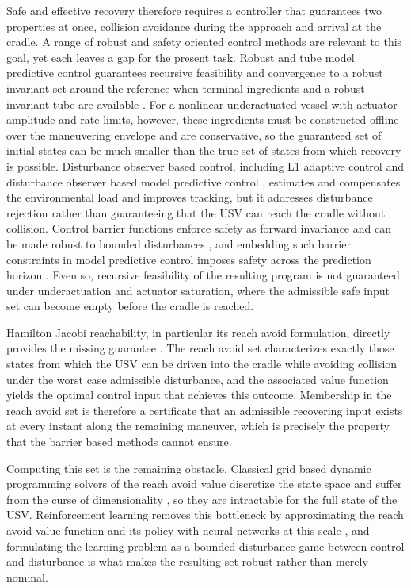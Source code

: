 \documentclass[5p,times,authoryear]{elsarticle}
\begin{document}
Safe and effective recovery therefore requires a controller that guarantees two properties at once, collision avoidance during the approach and arrival at the cradle. A range of robust and safety oriented control methods are relevant to this goal, yet each leaves a gap for the present task. Robust and tube model predictive control guarantees recursive feasibility and convergence to a robust invariant set around the reference when terminal ingredients and a robust invariant tube are available \citep{langson2004tube, mayne2005robust}. For a nonlinear underactuated vessel with actuator amplitude and rate limits, however, these ingredients must be constructed offline over the maneuvering envelope and are conservative, so the guaranteed set of initial states can be much smaller than the true set of states from which recovery is possible. Disturbance observer based control, including L1 adaptive control \citep{hovakimyan2010l1} and disturbance observer based model predictive control \citep{park2026recovery, tomera2021dob}, estimates and compensates the environmental load and improves tracking, but it addresses disturbance rejection rather than guaranteeing that the USV can reach the cradle without collision. Control barrier functions enforce safety as forward invariance and can be made robust to bounded disturbances \citep{xu2015robustness}, and embedding such barrier constraints in model predictive control imposes safety across the prediction horizon \citep{zeng2021safety, zeng2021enhancing}. Even so, recursive feasibility of the resulting program is not guaranteed under underactuation and actuator saturation, where the admissible safe input set can become empty before the cradle is reached.

Hamilton Jacobi reachability, in particular its reach avoid formulation, directly provides the missing guarantee \citep{margellos2011hamilton, bansal2017hamilton}. The reach avoid set characterizes exactly those states from which the USV can be driven into the cradle while avoiding collision under the worst case admissible disturbance, and the associated value function yields the optimal control input that achieves this outcome. Membership in the reach avoid set is therefore a certificate that an admissible recovering input exists at every instant along the remaining maneuver, which is precisely the property that the barrier based methods cannot ensure.

Computing this set is the remaining obstacle. Classical grid based dynamic programming solvers of the reach avoid value discretize the state space and suffer from the curse of dimensionality \citep{mitchell2005time}, so they are intractable for the full state of the USV. Reinforcement learning removes this bottleneck by approximating the reach avoid value function and its policy with neural networks at this scale \citep{bansal2021deepreach, fisac2019bridging, hsu2021safety}, and formulating the learning problem as a bounded disturbance game between control and disturbance is what makes the resulting set robust rather than merely nominal.
\end{document}
